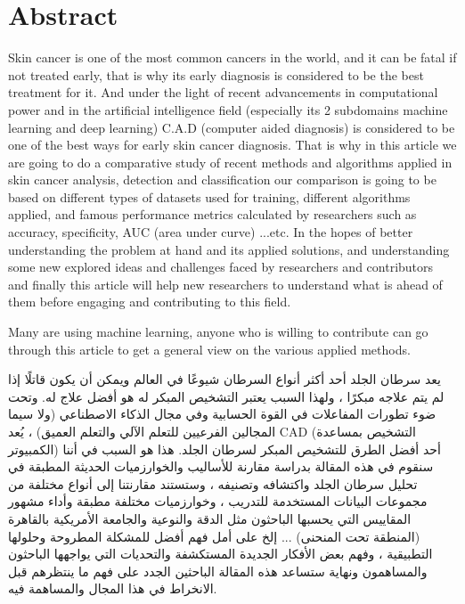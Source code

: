 \section*{Abstract}
Skin cancer is one of the most common cancers in the world, and it can be fatal if not treated early, that is why its early diagnosis is considered to be the best treatment for it. And under the light of recent advancements in computational power and in the artificial intelligence field (especially its 2 subdomains machine learning and deep learning) C.A.D (computer aided diagnosis) is considered to be one of the best ways for early skin cancer diagnosis. That is why in this article we are going to do a comparative study of recent methods and algorithms applied in skin cancer analysis, detection and classification our comparison is going to be based on different types of datasets used for training, different algorithms applied, and famous performance metrics calculated by researchers such as accuracy, specificity, AUC (area under curve) ...etc. In the hopes of better understanding the problem at hand and its applied solutions, and understanding some new explored ideas and challenges faced by researchers and contributors and finally this article will help new researchers to understand what is ahead of them before engaging and contributing to this field.

Many are using machine learning, anyone who is willing to contribute can go through this article to get a general view on the various applied methods.
\begin{center}
\end{center}
\begin{RLtext}

    يعد سرطان الجلد أحد أكثر أنواع السرطان شيوعًا في العالم ويمكن أن يكون قاتلًا إذا لم يتم علاجه مبكرًا ، ولهذا السبب يعتبر التشخيص المبكر له هو أفضل علاج له. وتحت ضوء تطورات المفاعلات في القوة الحسابية وفي مجال الذكاء الاصطناعي (ولا سيما المجالين الفرعيين للتعلم الآلي والتعلم العميق) ، يُعد CAD (التشخيص بمساعدة الكمبيوتر) أحد أفضل الطرق للتشخيص المبكر لسرطان الجلد. هذا هو السبب في أننا سنقوم في هذه المقالة بدراسة مقارنة للأساليب والخوارزميات الحديثة المطبقة في تحليل سرطان الجلد واكتشافه وتصنيفه ، وستستند مقارنتنا إلى أنواع مختلفة من مجموعات البيانات المستخدمة للتدريب ، وخوارزميات مختلفة مطبقة وأداء مشهور المقاييس التي يحسبها الباحثون مثل الدقة والنوعية والجامعة الأمريكية بالقاهرة (المنطقة تحت المنحنى) ... إلخ على أمل فهم أفضل للمشكلة المطروحة وحلولها التطبيقية ، وفهم بعض الأفكار الجديدة المستكشفة والتحديات التي يواجهها الباحثون والمساهمون ونهاية ستساعد هذه المقالة الباحثين الجدد على فهم ما ينتظرهم قبل الانخراط في هذا المجال والمساهمة فيه.


\end{RLtext}



